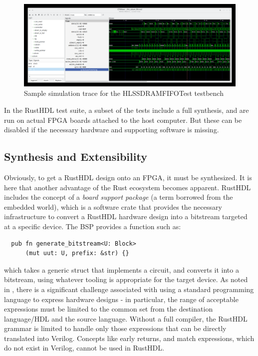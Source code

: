 \documentclass[conference]{IEEEtran}
\begin{document}
\begin{figure}[htbp]
  \centerline{\includegraphics[width=18cm]{hls_sdram_fifo.png}}
  \caption{Sample simulation trace for the \textrm{HLSSDRAMFIFOTest} testbench}
  \label{fig:trace}
\end{figure}
  
In the RustHDL test suite, a subset of the tests include a full synthesis, and are run on
actual FPGA boards attached to the host computer.  But these can be disabled if the necessary 
hardware and supporting software is missing.

\subsection{Synthesis and Extensibility}

Obviously, to get a RustHDL design onto an FPGA, it must be synthesized.  It is here that another 
advantage of the Rust ecosystem becomes apparent.  RustHDL includes the concept of a \emph{board support package} 
(a term borrowed from the embedded world), which is a software crate that provides the necessary infrastructure to
convert a RustHDL hardware design into a bitstream targeted at a specific device.  The BSP provides a function such 
as:

\begin{verbatim}
  pub fn generate_bitstream<U: Block>
      (mut uut: U, prefix: &str) {}
\end{verbatim}

which takes a generic struct that implements a circuit, and converts it into a bitstream, using whatever tooling is
appropriate for the target device.  As noted in \cite{b1}, there is a significant challenge associated with using 
a standard programming language to express hardware designs - in particular, the range of acceptable expressions
must be limited to the common set from the destination language/HDL and the source language.  Without a full compiler,
the RustHDL grammar is limited to handle only those expressions that can be directly translated into Verilog.  
Concepts like early returns, and match expressions, which do not exist in Verilog, cannot be used in RustHDL.  
\end{document}
